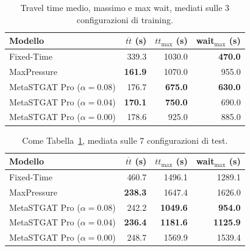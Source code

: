 \begin{table}[htbp]
  \centering
  \begin{tabular}{@{}lrrr@{}}
    \toprule
    Modello                       & $\overline{tt}$ (s) & $tt_{\max}$ (s) & wait$_{\max}$ (s) \\
    \midrule
    Fixed-Time                    & 339.3               & 1030.0          & \textbf{470.0}    \\
    MaxPressure                   & \textbf{161.9}      & 1070.0          & 955.0             \\
    MetaSTGAT Pro ($\alpha=0.08$) & 176.7               & \textbf{675.0}  & \textbf{630.0}    \\
    MetaSTGAT Pro ($\alpha=0.04$) & \textbf{170.1}      & \textbf{750.0}  & 690.0             \\
    MetaSTGAT Pro ($\alpha=0.00$) & 178.6               & 925.0           & 885.0             \\
    \bottomrule
  \end{tabular}
  \caption{Travel time medio, massimo e max wait, mediati
    sulle 3 configurazioni di training.}
  \label{tab:risultati-train}
\end{table}

\begin{table}[htbp]
  \centering
  \begin{tabular}{@{}lrrr@{}}
    \toprule
    Modello                       & $\overline{tt}$ (s) & $tt_{\max}$ (s) & wait$_{\max}$ (s) \\
    \midrule
    Fixed-Time                    & 460.7               & 1496.1          & 1289.1            \\
    MaxPressure                   & \textbf{238.3}      & 1647.4          & 1626.0            \\
    MetaSTGAT Pro ($\alpha=0.08$) & 242.2               & \textbf{1049.6} & \textbf{954.0}    \\
    MetaSTGAT Pro ($\alpha=0.04$) & \textbf{236.4}      & \textbf{1181.6} & \textbf{1125.9}   \\
    MetaSTGAT Pro ($\alpha=0.00$) & 248.7               & 1569.9          & 1539.4            \\
    \bottomrule
  \end{tabular}
  \caption{Come Tabella~\ref{tab:risultati-train}, mediata sulle 7
    configurazioni di test.}
  \label{tab:risultati-test}
\end{table}


